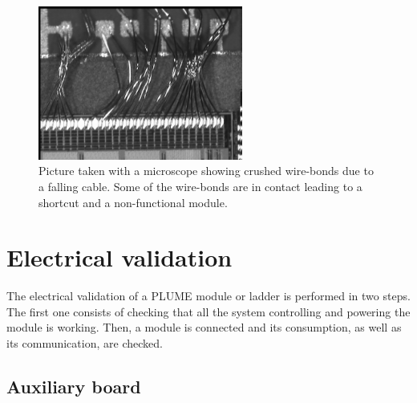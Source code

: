   \begin{figure}[!h]
    \centering
    \includegraphics[width=0.6\textwidth]{Pictures/labTests/crash_bonds.jpg}
    \caption{Picture taken with a microscope showing crushed wire-bonds due to a falling cable. Some of the wire-bonds are in contact leading to a shortcut and a non-functional module.}
    \label{fig:wireBondsCrashed}
  \end{figure}

\section{Electrical validation}

  The electrical validation of a \gls{PLUME} module or ladder is performed in two steps.
  The first one consists of checking that all the system controlling and powering the module is working. 
  Then, a module is connected and its consumption, as well as its communication, are checked.

  \subsection{Auxiliary board}

